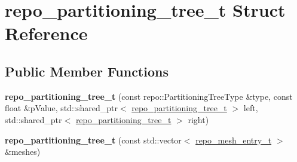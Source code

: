 \hypertarget{structrepo__partitioning__tree__t}{}\section{repo\+\_\+partitioning\+\_\+tree\+\_\+t Struct Reference}
\label{structrepo__partitioning__tree__t}
\subsection*{Public Member Functions}
\begin{DoxyCompactItemize}
\item 
\hypertarget{structrepo__partitioning__tree__t_a461f9d14df2bc25f3330a610dd255caf}{}{\bfseries repo\+\_\+partitioning\+\_\+tree\+\_\+t} (const repo\+::\+Partitioning\+Tree\+Type \&type, const float \&p\+Value, std\+::shared\+\_\+ptr$<$ \hyperlink{structrepo__partitioning__tree__t}{repo\+\_\+partitioning\+\_\+tree\+\_\+t} $>$ left, std\+::shared\+\_\+ptr$<$ \hyperlink{structrepo__partitioning__tree__t}{repo\+\_\+partitioning\+\_\+tree\+\_\+t} $>$ right)\label{structrepo__partitioning__tree__t_a461f9d14df2bc25f3330a610dd255caf}

\item 
\hypertarget{structrepo__partitioning__tree__t_a38423dbc2457f935d31cf748b52dce2c}{}{\bfseries repo\+\_\+partitioning\+\_\+tree\+\_\+t} (const std\+::vector$<$ \hyperlink{structrepo__mesh__entry__t}{repo\+\_\+mesh\+\_\+entry\+\_\+t} $>$ \&meshes)\label{structrepo__partitioning__tree__t_a38423dbc2457f935d31cf748b52dce2c}

\end{DoxyCompactItemize}
